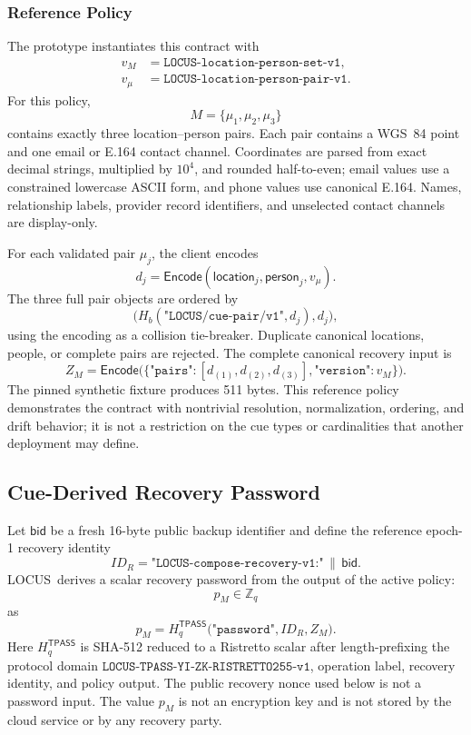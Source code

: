 \documentclass[sigconf,anonymous]{acmart}
\newcounter{protocol}
\newcommand{\LOCUS}{\textsf{LOCUS}}
\newcommand{\Encode}{\mathsf{Encode}}
\begin{document}
\subsubsection{Reference Policy}

The prototype instantiates this contract with
\[
\begin{aligned}
v_M&=\texttt{LOCUS-location-person-set-v1},\\
v_\mu&=\texttt{LOCUS-location-person-pair-v1}.
\end{aligned}
\]
For this policy,
\[
M=\{\mu_1,\mu_2,\mu_3\}
\]
contains exactly three location--person pairs. Each pair contains a WGS~84
point and one email or E.164 contact channel. Coordinates are parsed from exact
decimal strings, multiplied by \(10^4\), and rounded half-to-even; email values
use a constrained lowercase ASCII form, and phone values use canonical E.164.
Names, relationship labels, provider record identifiers, and unselected contact
channels are display-only.

For each validated pair \(\mu_j\), the client encodes
\[
d_j=\Encode(\mathsf{location}_j,\mathsf{person}_j,
v_\mu).
\]
The three full pair objects are ordered by
\[
\big(H_b(\texttt{"LOCUS/cue-pair/v1"},d_j),d_j\big),
\]
using the encoding as a collision tie-breaker. Duplicate canonical locations,
people, or complete pairs are rejected. The complete canonical recovery input is
\[
Z_M=\Encode\big(\{\texttt{"pairs"}:[d_{(1)},d_{(2)},d_{(3)}],
\texttt{"version"}:v_M\}\big).
\]
The pinned synthetic fixture produces 511 bytes. This reference policy
demonstrates the contract with nontrivial resolution, normalization, ordering,
and drift behavior; it is not a restriction on the cue types or cardinalities
that another deployment may define.

\subsection{Cue-Derived Recovery Password}

Let \(\mathsf{bid}\) be a fresh 16-byte public backup identifier and define the reference epoch-1 recovery identity
\[
ID_R=\texttt{"LOCUS-compose-recovery-v1:"}\,\|\,\mathsf{bid}.
\]
\LOCUS\ derives a scalar recovery password from the output of the active policy:
\[
p_M\in\mathbb{Z}_q
\]
as
\begin{equation}
p_M=H_q^{\mathsf{TPASS}}
\big(\texttt{"password"},ID_R,Z_M\big).
\label{eq:locus-cue-password}
\end{equation}
Here \(H_q^{\mathsf{TPASS}}\) is SHA-512 reduced to a Ristretto scalar after length-prefixing the protocol domain \(\texttt{LOCUS-TPASS-YI-ZK-RISTRETTO255-v1}\), operation label, recovery identity, and policy output. The public recovery nonce used below is not a password input. The value \(p_M\) is not an encryption key and is not stored by the cloud service or by any recovery party.
\end{document}
